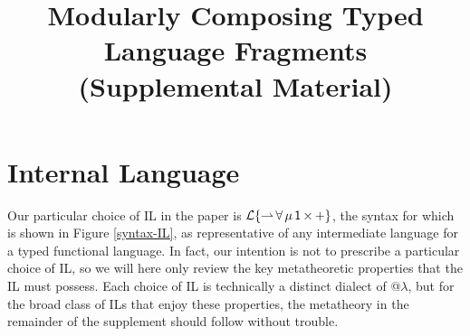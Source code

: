 \documentclass[12pt]{article}
\begin{document}

\title{Modularly Composing Typed Language Fragments (Supplemental Material)}

\author{ }


\trnumber{ }

\maketitle


\tableofcontents 
\listoffigures

\newpage



\section{Internal Language}
Our particular choice of IL in the paper is {$\mathcal{L}\{{\rightharpoonup}\,{\forall}\,{\mu}\,{{\sf 1}}\,{\times}\,{+}\}$}, the syntax for which is shown in Figure \ref{syntax-IL}, as representative of any intermediate language for a typed functional language. In fact, our intention is not to prescribe a particular choice of IL, so we will here only review the key metatheoretic properties that the IL must possess. Each choice of IL is technically a distinct dialect of @$\lambda$, but for the broad class of ILs that enjoy these properties, the metatheory in the remainder of the supplement should follow without trouble.
\end{document}
